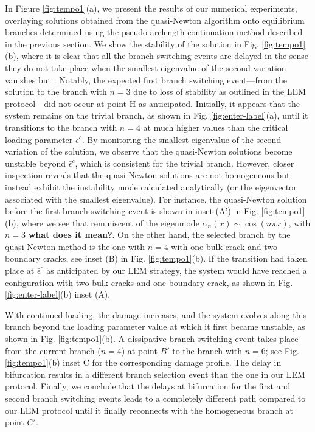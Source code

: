 In Figure \ref{fig:tempo1}(a), we present the results of our numerical experiments, overlaying solutions obtained from the quasi-Newton algorithm onto equilibrium branches determined using the pseudo-arclength continuation method described in the previous section. We show the stability of the solution in  Fig. \ref{fig:tempo1}(b), where it is clear that all the branch switching events are delayed in the sense they do not  take place when the smallest eigenvalue of the second variation vanishes but . Notably, the expected first branch switching event—from the  solution to the branch with \(n=3\) due to loss of stability as outlined in the LEM protocol—did not occur at point H as anticipated. Initially, it appears that the system remains on the trivial branch, as shown in Fig. \ref{fig:enter-label}(a), until it transitions to the branch with \(n=4\) at much higher values than the critical loading parameter \(\bar{\epsilon}^c\). By monitoring the smallest eigenvalue of the second variation of the solution, we observe that the quasi-Newton solutions become unstable beyond \(\bar{\epsilon}^c\), which is consistent for the trivial branch. However, closer inspection reveals that the quasi-Newton solutions are not homogeneous but instead exhibit the instability mode calculated analytically (or  the eigenvector associated with the smallest eigenvalue). For instance, the  quasi-Newton solution before the first branch switching event is shown in inset (A') in Fig. \ref{fig:tempo1}(b), where we see that  reminiscent of the eigenmode \(\alpha_n(x) \sim \cos(n\pi x)\),  with \(n=3\) \textbf{what does it mean?}. On the other hand, the selected branch  by the quasi-Newton method is the one with \(n=4\) with one bulk crack and two boundary cracks, see inset (B) in Fig. \ref{fig:tempo1}(b). If the transition had taken place at \(\bar{\epsilon}^c\) as anticipated by our LEM strategy, the system would have reached a configuration with two bulk cracks and one boundary crack, as shown in Fig. \ref{fig:enter-label}(b) inset (A).

With continued loading, the damage increases, and the system evolves along this branch beyond the loading parameter value at which it first became unstable, as shown in Fig. \ref{fig:tempo1}(b). A dissipative branch switching event takes place from the current branch (\(n=4\)) at point \(B'\) to the branch with \(n=6\); see Fig. \ref{fig:tempo1}(b) inset C for the corresponding damage profile. The delay in bifurcation results in a different branch selection event than the one in our LEM protocol. Finally, we conclude that the delays at bifurcation for the first and second branch switching events leads to a completely different path compared to our LEM protocol until it finally reconnects with the homogeneous branch at point \(C'\).

